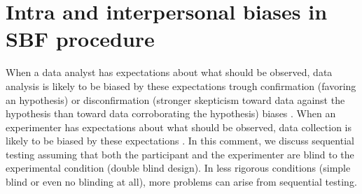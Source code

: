 \documentclass[a4paper,man,natbib,floatsintext,donotrepeattitle]{apa6}
\begin{document}





\section{Intra and interpersonal biases in SBF procedure}

When a data analyst has expectations about what should be observed, data analysis is likely to be biased by these expectations trough confirmation (favoring an hypothesis) or disconfirmation (stronger skepticism toward data against the hypothesis than toward data corroborating the hypothesis) biases \citep{lilienfeld_blind_2017}. When an experimenter has expectations about what should be observed, data collection is likely to be biased by these expectations \citep{orne_social_1962,rosenthal_social_1963,rosenthal_experimenter_1964,tuyttens_opinion_2016,zoble_interaction_1969}.
In this comment, we discuss sequential testing assuming that both the participant and the experimenter are blind to the experimental condition (double blind design). In less rigorous conditions (simple blind or even no blinding at all), more problems can arise from sequential testing. \par
\end{document}
